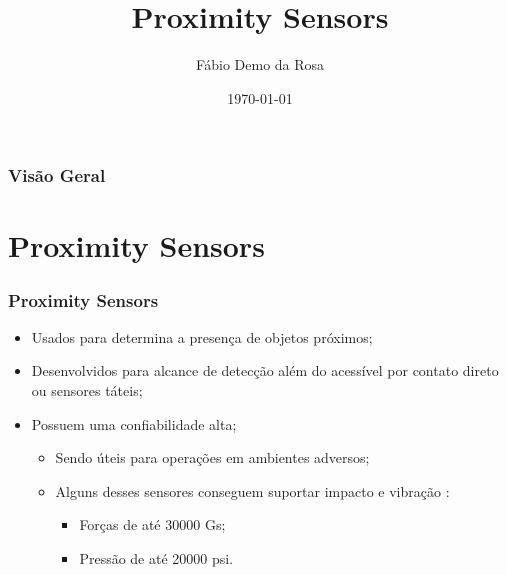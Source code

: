 \documentclass[xcolor=dvipsnames, aspectratio=169]{beamer}
\title[Proximity Sensors]{Proximity Sensors} %
\author[FDR]{Fábio Demo da Rosa} %
\institute[UFSM] %
{
Universidade Federal de Santa Maria \\ %
Pós-Graduação em Ciência da Computação \\
Disciplina de Robótica Móvel\\
\medskip
\textit{faberdemo@gmail.com} %
}
\date{\today} %
\begin{document}
\begin{frame}
\titlepage %
\end{frame}

\begin{frame}
\frametitle{Visão Geral} %
\tableofcontents %
\end{frame}


\section[Proximity Sensors]{Proximity Sensors} 
\begin{frame}
\frametitle{Proximity Sensors}
	\begin{itemize}
		\item Usados para determina a presença de objetos próximos;
		\item Desenvolvidos para alcance de detecção além do acessível por contato direto ou sensores táteis;
		\item Possuem uma confiabilidade alta;
		\begin{itemize}
			\item Sendo úteis para operações em ambientes adversos;
			\item Alguns desses sensores conseguem suportar impacto e vibração \cite{everett1995sensors}:
			\begin{itemize}
				\item Forças de até 30000 Gs;
				\item Pressão de até 20000 psi.
			\end{itemize}
		\end{itemize}
	\end{itemize}
\end{frame}
\end{document}
